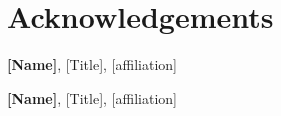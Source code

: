 \chapter*{Acknowledgements}

\textbf{[Name]}, [Title], [affiliation] \newline
[text]

\textbf{[Name]}, [Title], [affiliation] \newline
[text]

